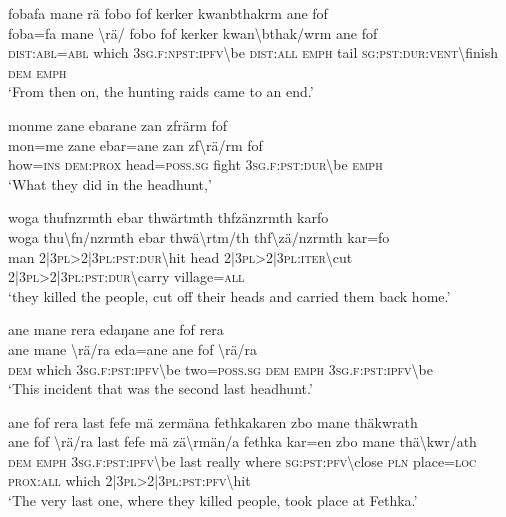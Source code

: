 \ea\label{ex:4:a1775}
fobafa mane rä fobo fof kerker kwanbthakrm ane fof\\
\gll foba=fa	mane	{\textbackslash}rä/	fobo	fof	kerker	kwan{\textbackslash}bthak/wrm	ane	fof\\
     \textsc{dist}:\textsc{abl}=\textsc{abl}	which	3\textsc{sg}.\textsc{f}:\textsc{npst}:\textsc{ipfv}{\textbackslash}be	\textsc{dist}:\textsc{all}	\textsc{emph}	tail	\textsc{sg}:\textsc{pst}:\textsc{dur}:\textsc{vent}{\textbackslash}finish	\textsc{dem}	\textsc{emph}\\
\glt `From then on, the hunting raids came to an end.'
\z

\ea\label{ex:4:a1776}
monme zane ebarane zan zfrärm fof\\
\gll mon=me	zane	ebar=ane	zan	zf{\textbackslash}rä/rm	fof\\
     how=\textsc{ins}	\textsc{dem}:\textsc{prox}	head=\textsc{poss}.\textsc{sg}	fight	3\textsc{sg}.\textsc{f}:\textsc{pst}:\textsc{dur}{\textbackslash}be	\textsc{emph}\\
\glt `What they did in the headhunt,'
\z

\ea\label{ex:4:a1777}
woga thufnzrmth ebar thwärtmth thfzänzrmth karfo\\
\gll woga	thu{\textbackslash}fn/nzrmth	ebar	thwä{\textbackslash}rtm/th	thf{\textbackslash}zä/nzrmth	kar=fo\\
     man	2|3\textsc{pl}>2|3\textsc{pl}:\textsc{pst}:\textsc{dur}{\textbackslash}hit	head	2|3\textsc{pl}>2|3\textsc{pl}:\textsc{iter}{\textbackslash}cut	2|3\textsc{pl}>2|3\textsc{pl}:\textsc{pst}:\textsc{dur}{\textbackslash}carry	village=\textsc{all}\\
\glt `they killed the people, cut off their heads and carried them back home.'
\z

\ea\label{ex:4:a1780}
ane mane rera edaŋane ane fof rera\\
\gll ane	mane	{\textbackslash}rä/ra	eda=ane	ane	fof	{\textbackslash}rä/ra\\
     \textsc{dem}	which	3\textsc{sg}.\textsc{f}:\textsc{pst}:\textsc{ipfv}{\textbackslash}be	two=\textsc{poss}.\textsc{sg}	\textsc{dem}	\textsc{emph}	3\textsc{sg}.\textsc{f}:\textsc{pst}:\textsc{ipfv}{\textbackslash}be\\
\glt `This incident that was the second last headhunt.'
\z

\ea\label{ex:4:a1784}
ane fof rera last fefe mä zermäna fethkakaren zbo mane thäkwrath\\
\gll ane	fof	{\textbackslash}rä/ra	last	fefe	mä	zä{\textbackslash}rmän/a	fethka	kar=en	zbo	mane	thä{\textbackslash}kwr/ath\\
     \textsc{dem}	\textsc{emph}	3\textsc{sg}.\textsc{f}:\textsc{pst}:\textsc{ipfv}{\textbackslash}be	last	really	where	\textsc{sg}:\textsc{pst}:\textsc{pfv}{\textbackslash}close	\textsc{pln}	place=\textsc{loc}	\textsc{prox}:\textsc{all}	which	2|3\textsc{pl}>2|3\textsc{pl}:\textsc{pst}:\textsc{pfv}{\textbackslash}hit\\
\glt `The very last one, where they killed people, took place at Fethka.'
\z

